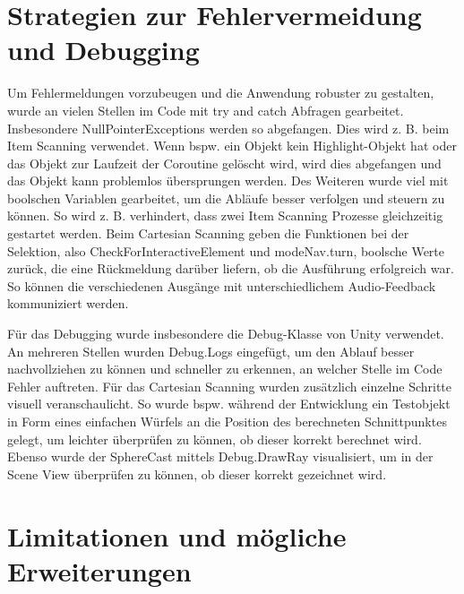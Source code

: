 \section{Strategien zur Fehlervermeidung und Debugging}

Um Fehlermeldungen vorzubeugen und die Anwendung robuster zu gestalten, wurde an vielen Stellen im Code mit try and catch Abfragen gearbeitet. Insbesondere NullPointerExceptions werden so abgefangen. Dies wird z. B.  beim Item Scanning verwendet. Wenn bspw. ein Objekt kein Highlight-Objekt hat oder das Objekt zur Laufzeit der Coroutine gelöscht wird, wird dies abgefangen und das Objekt kann problemlos übersprungen werden. Des Weiteren wurde viel mit boolschen Variablen gearbeitet, um die Abläufe besser verfolgen und steuern zu können. So wird z. B.  verhindert, dass zwei Item Scanning Prozesse gleichzeitig gestartet werden. Beim Cartesian Scanning geben die Funktionen bei der Selektion, also CheckForInteractiveElement und modeNav.turn, boolsche Werte zurück, die eine Rückmeldung darüber liefern, ob die Ausführung erfolgreich war. So können die verschiedenen Ausgänge mit unterschiedlichem Audio-Feedback kommuniziert werden. 

Für das Debugging wurde insbesondere die Debug-Klasse von Unity verwendet. An mehreren Stellen wurden Debug.Logs eingefügt, um den Ablauf besser nachvollziehen zu können und schneller zu erkennen, an welcher Stelle im Code Fehler auftreten. Für das Cartesian Scanning wurden zusätzlich einzelne Schritte visuell veranschaulicht. So wurde bspw. während der Entwicklung ein Testobjekt in Form eines einfachen Würfels an die Position des berechneten Schnittpunktes gelegt, um leichter überprüfen zu können, ob dieser korrekt berechnet wird. Ebenso wurde der SphereCast mittels Debug.DrawRay visualisiert, um in der Scene View überprüfen zu können, ob dieser korrekt gezeichnet wird.


\section{Limitationen und mögliche Erweiterungen}

